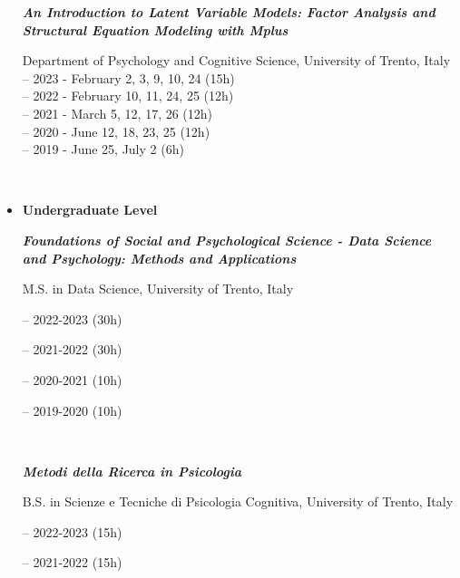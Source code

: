 \documentclass[hidelinks, letterpaper,10pt]{article} %
\begin{document}
\begin{itemize}
	\begin{center}
		\parbox{6.5in}{\textit{\textbf{An Introduction to Latent Variable Models: Factor Analysis and Structural Equation Modeling with Mplus}}}
		\parbox{6.5in} {Department of Psychology and Cognitive Science, University of Trento, Italy \\
		-- 2023 - February 2, 3, 9, 10, 24 (15h) \\
        -- 2022 - February 10, 11, 24, 25 (12h) \\
		-- 2021 - March 5, 12, 17, 26 (12h) \\ 
		-- 2020 - June 12, 18, 23, 25 (12h) \\
		-- 2019 - June 25, July 2 (6h)} \\ 
		\vspace{3mm}
	\end{center}
	
\item {\textbf{\large{Undergraduate Level}}}
   \begin{center}
		\parbox{6.5in}{\textit{\textbf{Foundations of Social and Psychological Science - Data Science and Psychology: Methods and Applications}}}
		\parbox{6.5in}{M.S. in Data Science, University of Trento, Italy}
		\parbox{6.5in} {-- 2022-2023 (30h)}
		\parbox{6.5in} {-- 2021-2022 (30h)}
		\parbox{6.5in} {-- 2020-2021 (10h)}
		\parbox{6.5in} {-- 2019-2020 (10h)}\\
		
		\vspace{3mm}
	    
	    \parbox{6.5in}{\textit{\textbf{Metodi della Ricerca in Psicologia}}}
		\parbox{6.5in}{B.S. in Scienze e Tecniche di Psicologia Cognitiva, University of Trento, Italy}
        \parbox{6.5in} {-- 2022-2023 (15h)}
		\parbox{6.5in} {-- 2021-2022 (15h)}
	
	\end{center}
\end{itemize}
\end{document}

